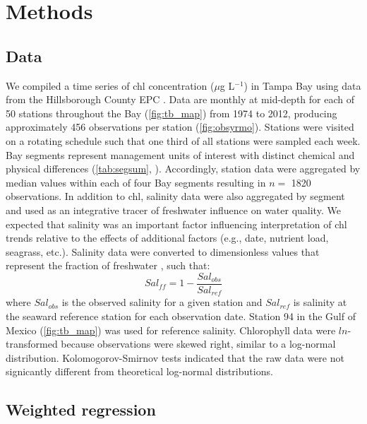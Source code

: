 \documentclass{svjour3}\usepackage[]{graphicx}\usepackage[]{color}
\newcommand{\mugl}{$\mu$g L$^{-1}$}
\begin{document}
\section{Methods}

\subsection{Data}

We compiled a time series of \ac{chl} concentration (\mugl) in Tampa Bay using data from the Hillsborough County \ac{EPC} \cite{TBEP11}.  Data are monthly at mid-depth for each of 50 stations throughout the Bay (\cref{fig:tb_map}) from 1974 to 2012, producing approximately 456 observations per station (\cref{fig:obsyrmo}).  Stations were visited on a rotating schedule such that one third of all stations were sampled each week.  Bay segments represent management units of interest with distinct chemical and physical differences (\cref{tab:segsum}, \cite{Lewis85}).  Accordingly, station data were aggregated by median values within each of four Bay segments resulting in $n=$ 1820 observations.  In addition to \ac{chl}, salinity data were also aggregated by segment and used as an integrative tracer of freshwater influence on water quality.  We expected that salinity was an important factor influencing interpretation of \ac{chl} trends relative to the effects of additional factors (e.g., date, nutrient load, seagrass, etc.).  Salinity data were converted to dimensionless values that represent the fraction of freshwater \cite{Dyer73}, such that:
\begin{equation}
Sal_{ff} = 1 - \frac{Sal_{obs}}{Sal_{ref}}
\end{equation}
\noindent where $Sal_{obs}$ is the observed salinity for a given station and $Sal_{ref}$ is salinity at the seaward reference station for each observation date.  Station 94 in the Gulf of Mexico (\cref{fig:tb_map}) was used for reference salinity.  Chlorophyll data were $ln$-transformed because observations were skewed right, similar to a log-normal distribution.  Kolomogorov-Smirnov tests indicated that the raw data were not signicantly different from theoretical log-normal distributions.

\subsection{Weighted regression}
\end{document}

